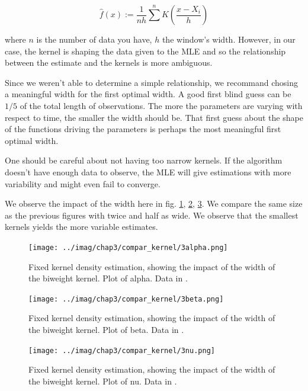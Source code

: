\documentclass[11pt]{book}
\begin{document}
$$ \hat{f}(x) := \frac 1 {n h} \sum^n K \left ( \frac{x - X_i } {h}  \right )$$

where $n$ is the number of data you have, $h$ the window's width. However, in our case, the kernel is shaping the data given to the MLE and so the relationship between the estimate and the kernels is more ambiguous.


Since we weren't able to determine a simple relationship, we recommand chosing a meaningful width for the first optimal width. A good first blind guess can be $1/5$ of the total length of observations. The more the parameters are varying with respect to time, the smaller the width should be. That first guess about the shape of the functions driving the parameters is perhaps the most meaningful first optimal width.

\begin{remarque}
One should be careful about not having too narrow kernels. If the algorithm doesn't have enough data to observe, the MLE will give estimations with more variability and might even fail to converge.
\end{remarque}

We observe the impact of the width here in fig. \ref{fig:basic_3_kernels_alpha}, \ref{fig:basic_3_kernels_beta}, \ref{fig:basic_3_kernels_nu}. We compare the same size as the previous figures with twice and half as wide. We observe that the smallest kernels yields the more variable estimates.

\begin{figure}
\centering
\texttt{[image: ../imag/chap3/compar\_kernel/3alpha.png]}
\caption{Fixed kernel density estimation, showing the impact of the width of the biweight kernel. Plot of alpha. Data in \protect {}.}
\label{fig:basic_3_kernels_alpha}
\end{figure}

\begin{figure}
\centering
\texttt{[image: ../imag/chap3/compar\_kernel/3beta.png]}
\caption{Fixed kernel density estimation, showing the impact of the width of the biweight kernel. Plot of beta. Data in \protect {}.}
\label{fig:basic_3_kernels_beta}
\end{figure}

\begin{figure}
\centering
\texttt{[image: ../imag/chap3/compar\_kernel/3nu.png]}
\caption{Fixed kernel density estimation, showing the impact of the width of the biweight kernel. Plot of nu. Data in \protect {}.}
\label{fig:basic_3_kernels_nu}
\end{figure}
\end{document}
